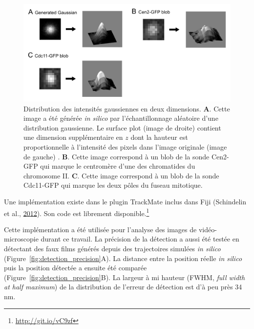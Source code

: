 \documentclass[12pt,a4paper,twoside,openright]{book}
\begin{document}
\begin{figure}[htbp]
\centering
\includegraphics{figures/results/imaging/gaussian.png}
\caption[Distribution des intensités gaussiennes en deux dimensions]{\label{fig:gaussian}Distribution
des intensités gaussiennes en deux dimensions. \textbf{A}. Cette image a
été générée \emph{in silico} par l'échantillonnage aléatoire d'une
distribution gaussienne. Le surface plot (image de droite) contient une
dimension supplémentaire en \(z\) dont la hauteur est proportionnelle à
l'intensité des pixels dans l'image originale (image de gauche) .
\textbf{B}. Cette image correspond à un blob de la sonde Cen2-GFP qui
marque le centromère d'une des chromatides du chromosome II. \textbf{C}.
Cette image correspond à un blob de la sonde Cdc11-GFP qui marque les
deux pôles du fuseau mitotique.}
\end{figure}

Une implémentation existe dans le plugin TrackMate inclus dans Fiji
(Schindelin et al., \hyperref[ref-Schindelin2012]{2012}). Son code est
librement disponible.\footnote{\url{http://git.io/vC9zf}}

Cette implémentation a été utilisée pour l'analyse des images de
vidéo-microscopie durant ce travail. La précision de la détection a
aussi été testée en détectant des faux films générés depuis des
trajectoires simulées \emph{in silico}
(Figure~\ref{fig:detection_precision}A). La distance entre la position
réelle \emph{in silico} puis la position détectée a ensuite été comparée
(Figure~\ref{fig:detection_precision}B). La largeur à mi hauteur (FWHM,
\emph{full width at half maximum}) de la distribution de l'erreur de
détection est d'à peu près 34 nm.
\end{document}

